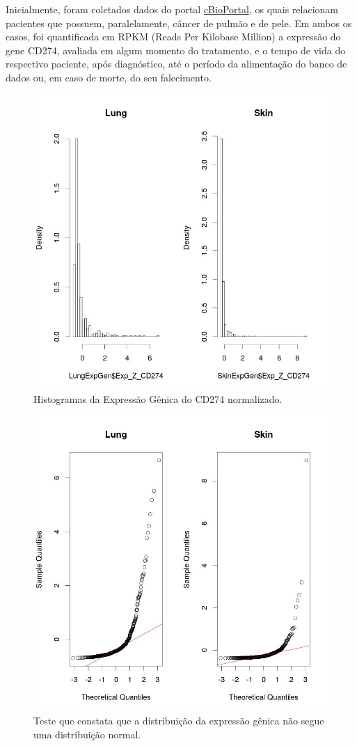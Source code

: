 \documentclass[a4paper,12pt]{article}
\begin{document}
Inicialmente, foram coletados dados do portal \href{https://www.cbioportal.org/}{cBioPortal}, os quais
relacionam pacientes que possuem, paralelamente, câncer de pulmão e de pele. Em ambos os casos, foi
quantificada em RPKM (Reads Per Kilobase Million) a expressão do gene CD274, avaliada em algum momento do tratamento, e o tempo de vida do respectivo paciente, após diagnóstico, até o período da alimentação do banco 
de dados ou, em caso de morte, do seu falecimento.

\begin{figure}[h!]
\centering
\includegraphics[width=0.7 \textwidth]{plot_histograma2.jpeg}
\caption{Histogramas da Expressão Gênica do CD274 normalizado.}
\label{fig:Hist2}
\end{figure}

\begin{figure}[h!]
\centering
\includegraphics[width=0.5 \textwidth]{plot_testeNorm.jpeg}
\caption{Teste que constata que a distribuição da expressão gênica não segue uma distribuição normal.}
\label{fig:TesteNorm}
\end{figure}
\end{document}
